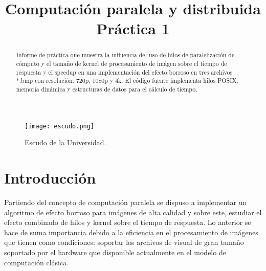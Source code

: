 \documentclass{IEEEtran}
\begin{document}
%
\title{Computación paralela y distribuida\\Práctica 1}


\author{
}

\maketitle

\begin{figure}[!t]
\centering
\texttt{[image: escudo.png]}
\caption{Escudo de la Universidad.}
\label{fig_sim}
\end{figure}

\begin{abstract}
Informe de práctica que muestra la influencia del uso de hilos de paralelización de cómputo y el tamaño de kernel de procesamiento de imágen sobre el tiempo de respuesta y el speedup en una implementación del efecto borroso en tres archivos *.bmp con resolución: 720p, 1080p y 4k. El código fuente implementa hilos POSIX, memoria dinámica y estructuras de datos para el cálculo de tiempo.
\end{abstract}


%
\IEEEpeerreviewmaketitle

\section{Introducción}
Partiendo del concepto de computación paralela se dispuso a implementar un algoritmo de efecto borroso para imágenes de alta calidad y sobre este, estudiar el efecto combinado de hilos y kernel sobre el tiempo de respuesta. Lo anterior se hace de suma importancia debido a la eficiencia en el procesamiento de imágenes que tienen como condiciones: soportar los archivos de visual de gran tamaño soportado por el hardware que disponible actualmente en el modelo de computación clásica.
        
\end{document}
